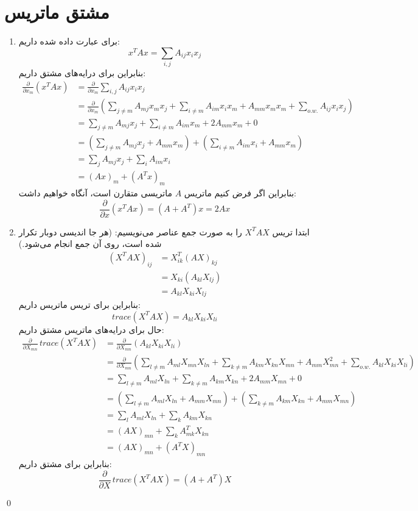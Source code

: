 \documentclass[a4paper, 11pt]{article}
\begin{document}
\section{مشتق ماتریس}
\begin{enumerate}
	\item
	برای عبارت داده شده داریم:
	\[
	x^TAx = \sum_{i,j} A_{ij}x_{i}x_{j}
	\]
	بنابراین برای درایه‌های مشتق داریم:
	\[
	\begin{aligned}
		\frac{\partial}{\partial x_m} (x^TAx)	&= \frac{\partial}{\partial x_m} \sum_{i,j} A_{ij}x_i x_j \\[0.75em]
			&= \frac{\partial}{\partial x_m} \left(\sum_{j\ne m} A_{mj}x_m x_j + \sum_{i\ne m} A_{im}x_i x_m + A_{mm}x_mx_m + \sum_{o.w.} A_{ij}x_i x_j\right) \\[0.75em]
			&= \sum_{j\ne m} A_{mj}x_j + \sum_{i\ne m} A_{im}x_m + 2A_{mm}x_m + 0 \\[0.75em]
			&= \left(\sum_{j\ne m} A_{mj}x_j + A_{mm}x_m\right) + \left(\sum_{i\ne m} A_{im}x_i + A_{mm}x_m\right) \\[0.75em]
			&= \sum_{j}A_{mj}x_j + \sum_{i} A_{im} x_i \\[0.75em]
			&= (Ax)_m + (A^Tx)_m
	\end{aligned}
	\]
	بنابراین اگر فرض کنیم ماتریس $A$ ماتریسی متقارن است، آنگاه خواهیم داشت:
	\[
	\boxed{\frac{\partial}{\partial x}(x^TAx) = (A+A^T)x = 2Ax}
	\]
	\item
	ابتدا تریس 
	$X^TAX$
	را به صورت جمع عناصر می‌نویسیم: (هر جا اندیسی دوبار تکرار شده است، روی آن جمع انجام می‌شود.)
	\[
	\begin{aligned}
		(X^TAX)_{ij}	&= X^T_{ik}(AX)_{kj} \\
						&= X_{ki} (A_{kl}X_{lj}) \\
						&= A_{kl} X_{ki} X_{lj}
	\end{aligned}
	\]
	بنابراین برای تریس ماتریس داریم:
	\[
	trace(X^TAX) = A_{kl}X_{ki}X_{li}
	\]
	حال برای درایه‌های ماتریس مشتق داریم:
	\[
	\begin{aligned}
		\frac{\partial}{\partial X_{mn}} \, trace(X^TAX)&= \frac{\partial}{\partial X_{mn}} \left(A_{kl} X_{ki} X_{li}\right) \\[0.75em]
		&= \frac{\partial}{\partial X_{mn}} \left(\sum_{l \ne m} A_{ml}X_{mn}X_{ln} +‌\sum_{k \ne m} A_{km}X_{kn}X_{mn} + A_{mm}X_{mn}^2 + \sum_{o.w.} A_{kl}X_{ki}X_{li}\right)\\[0.75em]
		&= \sum_{l \ne m} A_{ml}X_{ln} + \sum_{k \ne m} A_{km}X_{kn} + 2A_{mm}X_{mn} + 0\\[0.75em]
		&= \left(\sum_{l \ne m} A_{ml}X_{ln} + A_{mm}X_{mn}\right) + \left(\sum_{k \ne m} A_{km}X_{kn} + A_{mm}X_{mn}\right)\\[0.75em]
		&= \sum_l A_{ml}X_{ln} + \sum_{k} A_{km}X_{kn} \\[0.75em]
		&= (AX)_{mn} + \sum_k A^T_{mk}X_{kn} \\[0.75em]
		&= (AX)_{mn} + (A^TX)_{mn}
	\end{aligned}
	\]
	بنابراین برای مشتق داریم:
	\[
	\boxed{\frac{\partial}{\partial X} \, trace(X^TAX)= (A + A^T)X}
	\]
\end{enumerate}
\qed
\end{document}
